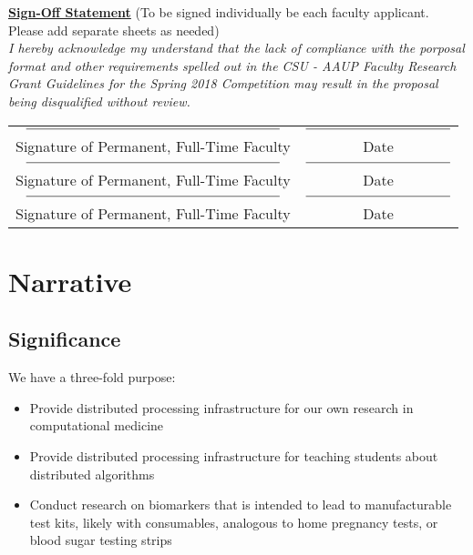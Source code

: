 \documentclass[]{article}
\begin{document}
\underline{\textbf{Sign-Off Statement}} (To be signed individually be each faculty applicant. Please add separate sheets as needed)\\
\textit{I hereby acknowledge my understand that the lack of compliance with the porposal format and other requirements spelled out in the CSU - AAUP Faculty Research Grant Guidelines for the Spring 2018 Competition may result in the proposal being disqualified without review.}\\

\begin{tabular}{cc}
	
	$\rule{7cm}{0.15mm}$	& $\rule{4cm}{0.15mm}$ \\ 
	
	Signature of Permanent, Full-Time Faculty	&  Date\\ 
	
	$\rule{7cm}{0.15mm}$	&  $\rule{4cm}{0.15mm}$\\ 
	
	Signature of Permanent, Full-Time Faculty	&  Date\\ 
	
	$\rule{7cm}{0.15mm}$	& $\rule{4cm}{0.15mm}$\\ 
	
	Signature of Permanent, Full-Time Faculty	&  Date\\ 
	
\end{tabular} 


\section{Narrative}






\subsection{Significance}%
We have a three-fold purpose: 
\begin{itemize}
	\item Provide distributed processing infrastructure for our own research in computational medicine
	\item Provide distributed processing infrastructure for teaching students about distributed algorithms
	\item Conduct research on biomarkers that is intended to lead to manufacturable test kits, likely with consumables, analogous to home pregnancy tests, or blood sugar testing strips
\end{itemize}
\end{document}
